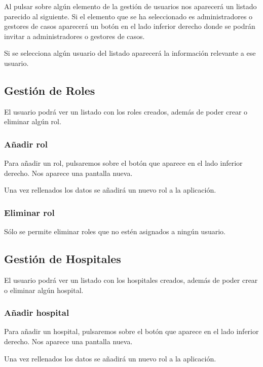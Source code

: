 Al pulsar sobre algún elemento de la gestión de usuarios nos aparecerá un listado parecido al siguiente. Si el elemento que se ha seleccionado es administradores o gestores de casos aparecerá un botón en el lado inferior derecho donde se podrán invitar a administradores o gestores de casos.


Si se selecciona algún usuario del listado aparecerá la información relevante a ese usuario.

\subsection{Gestión de Roles}
El usuario podrá ver un listado con los roles creados, además de poder crear o eliminar algún rol.

\subsubsection{Añadir rol}
Para añadir un rol, pulsaremos sobre el botón que aparece en el lado inferior derecho. Nos aparece una pantalla nueva.

Una vez rellenados los datos se añadirá un nuevo rol a la aplicación.

\subsubsection{Eliminar rol}
Sólo se permite eliminar roles que no estén asignados a ningún usuario.

\subsection{Gestión de Hospitales}
El usuario podrá ver un listado con los hospitales creados, además de poder crear o eliminar algún hospital.

\subsubsection{Añadir hospital}
Para añadir un hospital, pulsaremos sobre el botón que aparece en el lado inferior derecho. Nos aparece una pantalla nueva.

Una vez rellenados los datos se añadirá un nuevo rol a la aplicación.

